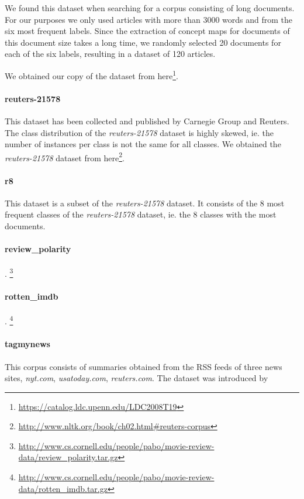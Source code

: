 We found this dataset when searching for a corpus consisting of long documents. 
For our purposes we only used articles with more than 3000 words and from the six most frequent labels.
Since the extraction of concept maps for documents of this document size takes a long time, we randomly selected 20 documents for each of the six labels, resulting in a dataset of 120 articles.

We obtained our copy of the dataset from here\footnote{\url{https://catalog.ldc.upenn.edu/LDC2008T19}}.

\paragraph{reuters-21578}
This dataset has been collected and published by Carnegie Group and Reuters.
The class distribution of the \textit{reuters-21578} dataset is highly skewed, ie. the number of instances per class is not the same for all classes. 
We obtained the \textit{reuters-21578} dataset from here\footnote{\url{http://www.nltk.org/book/ch02.html\#reuters-corpus}}.

\paragraph{r8}
This dataset is a subset of the \textit{reuters-21578} dataset.
It consists of the 8 most frequent classes of the \textit{reuters-21578} dataset, ie. the 8 classes with the most documents.

\paragraph{review\_polarity}
\cite{Pang2004}.
\footnote{\url{http://www.cs.cornell.edu/people/pabo/movie-review-data/review\_polarity.tar.gz}}

\paragraph{rotten\_imdb}
\cite{Pang2004}.
\footnote{\url{http://www.cs.cornell.edu/people/pabo/movie-review-data/rotten\_imdb.tar.gz}}

\paragraph{tagmynews}
This corpus consists of summaries obtained from the RSS feeds of three news sites, \textit{nyt.com}, \textit{usatoday.com}, \textit{reuters.com}.
The dataset was introduced by 

